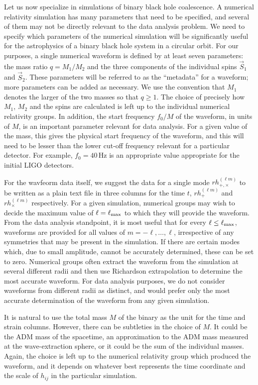 \documentclass[prd,preprintnumbers,superscriptaddress,eqsecnum]{revtex4}
\numberwithin{equation}{section}
\begin{document}
Let us now specialize in simulations of binary black hole coalescence.
A numerical relativity simulation has many parameters that need to be
specified, and several of them may not be directly relevant to the
data analysis problem. We need to specify which parameters of the
numerical simulation will be significantly useful for the astrophysics
of a binary black hole system in a circular orbit. For our purposes, a
single numerical waveform is defined by at least seven parameters: the
mass ratio $q = M_1/M_2$ and the three components of the individual
spins $\vec{S}_1$ and $\vec{S}_2$. These parameters will be referred
to as the ``metadata'' for a waveform; more parameters can be added as
necessary. We use the convention that $M_1$ denotes the larger of the
two masses so that $q\geq 1$. The choice of precisely how $M_1$, $M_2$
and the spins are calculated is left up to the individual numerical
relativity groups. In addition, the start frequency $f_0/M$ of the
waveform, in units of $M$, is an important parameter relevant for data
analysis.  For a given value of the mass, this gives the physical
start frequency of the waveform, and this will need to be lesser than
the lower cut-off frequency relevant for a particular detector.  For
example, $f_0 = 40\,$Hz is an appropriate value appropriate for the
initial LIGO detectors.

For the wavfeorm data itself, we suggest the data for a single mode
$rh_{+,\times}^{(\ell m)}$ to be written as a plain text file in three
columns for the time $t$, $rh_+^{(\ell m)}$ and $rh_\times^{(\ell m)}$
respectively. For a given simulation, numerical groups may wish to
decide the maximum value of $\ell = \ell_{\rm max}$ to which they will
provide the waveform. From the data analysis standpoint, it is most
useful that for every $\ell \leq \ell_{\rm max}$, waveforms are
provided for all values of $m = -\ell, \ldots, \ell$, irrespective of
any symmetries that may be present in the simulation. If there are
certain modes which, due to small amplitude, cannot be accurately
determined, these can be set to zero. Numerical groups often extract
the waveform from the simulation at several different radii and then
use Richardson extrapolation to determine the most accurate waveform.
For data analysis purposes, we do not consider waveforms from
different radii as distinct, and would prefer only the most accurate
determination of the waveform from any given simulation.

It is natural to use the total mass $M$ of the binary as the unit for
the time and strain columns. However, there can be subtleties in the
choice of $M$. It could be the ADM mass of the spacetime, an
approximation to the ADM mass measured at the wave-extraction sphere,
or it could be the sum of the individual masses. Again, the choice is
left up to the numerical relativity group which produced the waveform,
and it depends on whatever best represents the time coordinate and the
scale of $h_{ij}$ in the particular simulation.
\end{document}
